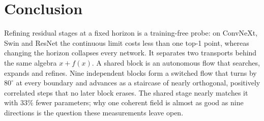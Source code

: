 \section{Conclusion}
\label{sec:conclusion}

Refining residual stages at a fixed horizon is a training-free probe: on ConvNeXt,
Swin and ResNet the continuous limit costs less than one top-1 point, whereas changing
the horizon collapses every network.
It separates two transports behind the same algebra $x+f(x)$.
A shared block is an autonomous flow that searches, expands and refines.
Nine independent blocks form a switched flow that turns by $80^\circ$ at every
boundary and advances as a staircase of nearly orthogonal, positively correlated steps
that no later block erases.
The shared stage nearly matches it with $33\%$ fewer parameters; why one coherent
field is almost as good as nine directions is the question these measurements leave
open.
